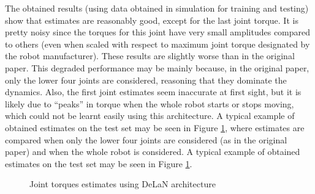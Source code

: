 The obtained results (using data obtained in simulation for training and testing) show that estimates are reasonably good, except for the last joint torque. It is pretty noisy since the torques for this joint have very small amplitudes compared to others (even when scaled with respect to maximum joint torque designated by the robot manufacturer). These results are slightly worse than in the original paper. This degraded performance may be mainly because, in the original paper, only the lower four joints are considered, reasoning that they dominate the dynamics. Also, the first joint estimates seem inaccurate at first sight, but it is likely due to ``peaks'' in torque when the whole robot starts or stops moving, which could not be learnt easily using this architecture. A typical example of obtained estimates on the test set may be seen in Figure \ref{fig:DeLaNTorques}, where estimates are compared when only the lower four joints are considered (as in the original paper) and when the whole robot is considered. A typical example of obtained estimates on the test set may be seen in Figure \ref{fig:DeLaNTorques}.

\begin{figure}
    \centering
    \vfill
    \caption{Joint torques estimates using DeLaN architecture}
    \label{fig:DeLaNTorques}
\end{figure}

\newpage
